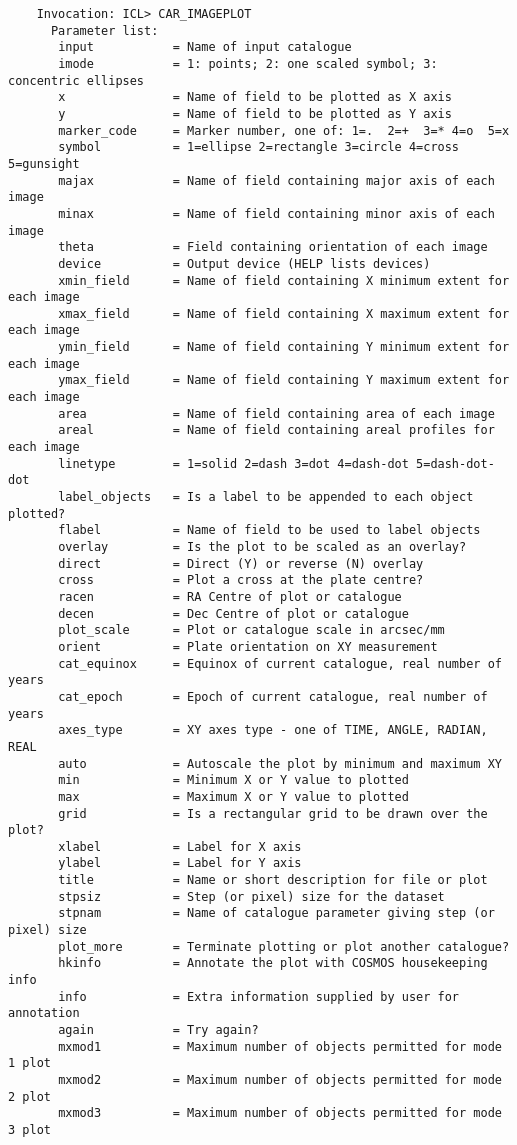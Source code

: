    \begin{verbatim}
    Invocation: ICL> CAR_IMAGEPLOT
      Parameter list:
       input           = Name of input catalogue
       imode           = 1: points; 2: one scaled symbol; 3: concentric ellipses
       x               = Name of field to be plotted as X axis
       y               = Name of field to be plotted as Y axis
       marker_code     = Marker number, one of: 1=.  2=+  3=* 4=o  5=x
       symbol          = 1=ellipse 2=rectangle 3=circle 4=cross 5=gunsight
       majax           = Name of field containing major axis of each image
       minax           = Name of field containing minor axis of each image
       theta           = Field containing orientation of each image
       device          = Output device (HELP lists devices)
       xmin_field      = Name of field containing X minimum extent for each image
       xmax_field      = Name of field containing X maximum extent for each image
       ymin_field      = Name of field containing Y minimum extent for each image
       ymax_field      = Name of field containing Y maximum extent for each image
       area            = Name of field containing area of each image
       areal           = Name of field containing areal profiles for each image
       linetype        = 1=solid 2=dash 3=dot 4=dash-dot 5=dash-dot-dot
       label_objects   = Is a label to be appended to each object plotted?
       flabel          = Name of field to be used to label objects
       overlay         = Is the plot to be scaled as an overlay?
       direct          = Direct (Y) or reverse (N) overlay
       cross           = Plot a cross at the plate centre?
       racen           = RA Centre of plot or catalogue
       decen           = Dec Centre of plot or catalogue
       plot_scale      = Plot or catalogue scale in arcsec/mm
       orient          = Plate orientation on XY measurement
       cat_equinox     = Equinox of current catalogue, real number of years
       cat_epoch       = Epoch of current catalogue, real number of years
       axes_type       = XY axes type - one of TIME, ANGLE, RADIAN, REAL
       auto            = Autoscale the plot by minimum and maximum XY
       min             = Minimum X or Y value to plotted
       max             = Maximum X or Y value to plotted
       grid            = Is a rectangular grid to be drawn over the plot?
       xlabel          = Label for X axis
       ylabel          = Label for Y axis
       title           = Name or short description for file or plot
       stpsiz          = Step (or pixel) size for the dataset
       stpnam          = Name of catalogue parameter giving step (or pixel) size
       plot_more       = Terminate plotting or plot another catalogue?
       hkinfo          = Annotate the plot with COSMOS housekeeping info
       info            = Extra information supplied by user for annotation
       again           = Try again?
       mxmod1          = Maximum number of objects permitted for mode 1 plot
       mxmod2          = Maximum number of objects permitted for mode 2 plot
       mxmod3          = Maximum number of objects permitted for mode 3 plot
\end{verbatim}

